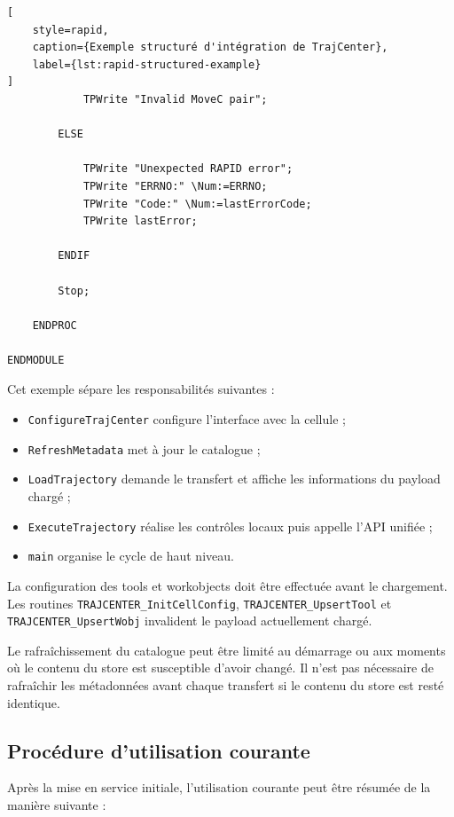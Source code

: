 \documentclass{rapportENSAM}
\begin{document}
\begin{lstlisting}[
    style=rapid,
    caption={Exemple structuré d'intégration de TrajCenter},
    label={lst:rapid-structured-example}
]
            TPWrite "Invalid MoveC pair";

        ELSE

            TPWrite "Unexpected RAPID error";
            TPWrite "ERRNO:" \Num:=ERRNO;
            TPWrite "Code:" \Num:=lastErrorCode;
            TPWrite lastError;

        ENDIF

        Stop;

    ENDPROC

ENDMODULE
\end{lstlisting}

Cet exemple sépare les responsabilités suivantes :

\begin{itemize}
    \item \texttt{ConfigureTrajCenter} configure l'interface avec la cellule ;
    \item \texttt{RefreshMetadata} met à jour le catalogue ;
    \item \texttt{LoadTrajectory} demande le transfert et affiche les
    informations du payload chargé ;
    \item \texttt{ExecuteTrajectory} réalise les contrôles locaux puis appelle
    l'API unifiée ;
    \item \texttt{main} organise le cycle de haut niveau.
\end{itemize}

La configuration des tools et workobjects doit être effectuée avant le
chargement. Les routines \texttt{TRAJCENTER\_InitCellConfig},
\texttt{TRAJCENTER\_UpsertTool} et
\texttt{TRAJCENTER\_UpsertWobj} invalident le payload actuellement chargé.

Le rafraîchissement du catalogue peut être limité au démarrage ou aux moments
où le contenu du store est susceptible d'avoir changé. Il n'est pas nécessaire
de rafraîchir les métadonnées avant chaque transfert si le contenu du store est
resté identique.


\subsection{Procédure d'utilisation courante}
\label{subsec:rapid-daily-operation}

Après la mise en service initiale, l'utilisation courante peut être résumée de
la manière suivante :
\end{document}
